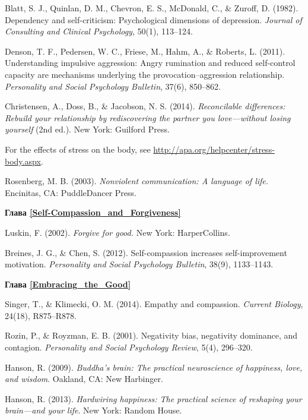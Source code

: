 \begin{thebibliography}{999}
	 Blatt, S. J., Quinlan, D. M., Chevron, E. S., McDonald, C., \& Zuroff, D. (1982). Dependency and self-criticism: Psychological dimensions of depression. \textit{Journal of Consulting and Clinical Psychology}, 50(1), 113–124.
	
	 Denson, T. F., Pedersen, W. C., Friese, M., Hahm, A., \& Roberts, L. (2011). Understanding impulsive aggression: Angry rumination and reduced self-control capacity are mechanisms underlying the provocation–aggression relationship. \textit{Personality and Social Psychology Bulletin}, 37(6), 850–862.
	
	 Christensen, A., Doss, B., \& Jacobson, N. S. (2014).\textit{ Reconcilable differences: Rebuild your relationship by rediscovering the partner you love—without losing yourself} (2nd ed.). New York: Guilford Press.
	
	 For the effects of stress on the body, see \url{http://apa.org/helpcenter/stress-body.aspx}. 
	
	 Rosenberg, M. B. (2003). \textit{Nonviolent communication: A language of life.} Encinitas, CA: PuddleDancer Press.
	
	
	\vspace{3ex}
	\textbf{Глава \ref{Self-Compassion_and_Forgiveness}}
	
	 Luskin, F. (2002). \textit{Forgive for good.} New York: HarperCollins.
	
	 Breines, J. G., \& Chen, S. (2012). Self-compassion increases self-improvement motivation. \textit{Personality and Social Psychology Bulletin}, 38(9), 1133–1143.
	
	
	\vspace{7ex}
	\textbf{Глава \ref{Embracing_the_Good}}
	
	 Singer, T., \& Klimecki, O. M. (2014). Empathy and compassion. \textit{Current Biology}, 24(18), R875–R878.
	
	 Rozin, P., \& Royzman, E. B. (2001). Negativity bias, negativity dominance, and contagion. \textit{Personality and Social Psychology Review}, 5(4), 296–320.
	
	 Hanson, R. (2009). \textit{Buddha’s brain: The practical neuroscience of happiness, love, and wisdom}. Oakland, CA: New Harbinger.
	
	 Hanson, R. (2013). \textit{Hardwiring happiness: The practical science of reshaping your brain—and your life}. New York: Random House.
	

\end{thebibliography}
